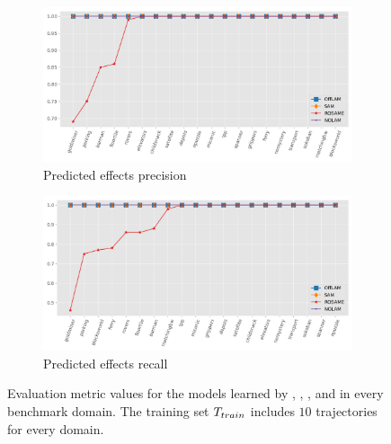 \begin{figure}[ht]
  \begin{subfigure}[b]{0.45\textwidth}
    \includegraphics[width=\textwidth]{figures/10_traces/lineplots/predeffs_precision_line.png}
    \caption{Predicted effects precision}
  \end{subfigure}
  \begin{subfigure}[b]{0.45\textwidth}
    \includegraphics[width=\textwidth]{figures/10_traces/lineplots/predeffs_recall_line.png}
    \caption{Predicted effects recall}
  \end{subfigure}



\caption{Evaluation metric values for the models learned by \sam, \offlam, \nolam, and \rosame in every benchmark domain. The training set $T_{train}$ includes $10$ trajectories for every domain.  }
\end{figure} 

